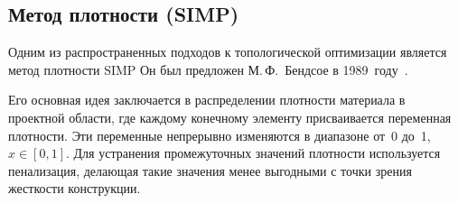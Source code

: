 

\subsection{Метод плотности (SIMP)}

Одним из распространенных подходов к топологической оптимизации является метод плотности SIMP
Он был предложен М.\,Ф.~Бендсое в 1989~году~\cite{Bendsoe1989}.

Его основная идея заключается в распределении плотности материала в проектной области, где каждому конечному элементу присваивается переменная плотности. Эти переменные непрерывно изменяются в диапазоне от~0 до~1, $x\in[0,1]$. Для устранения промежуточных значений плотности используется пенализация, делающая такие значения менее выгодными с точки зрения жесткости конструкции.


